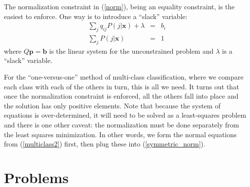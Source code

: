 \documentclass{article}
\renewcommand{\vec}[1]{\boldsymbol{#1}}
\begin{document}
The normalization constraint in (\ref{norm}), being an equality constraint,
is the easiest to enforce.
One way is to introduce a ``slack'' variable:
\begin{eqnarray}
	\sum_j q_{ij} P(j|\vec x) + \lambda & = & b_i \nonumber \\
	\sum_j P(j|\vec x) & = & 1 \label{symmetric_norm}
\end{eqnarray}
where $Q \vec p = \vec b$ is the linear system for the unconstrained problem
and $\lambda$ is a ``slack'' variable.

For the ``one-versus-one'' method of multi-class classification, where we
compare each class with each of the others in turn, this is all we need.
It turns out that once the normalization constraint is enforced, all the others
fall into place and the solution has only positive elements.
Note that because the system of equations is over-determined, 
it will need to be solved as a least-squares problem and there is one
other caveat: the normalization must be done separately from the least
squares minimization.
In other words, we form the normal equations from (\ref{multiclass2}) first,
then plug these into (\ref{symmetric_norm}).

\section{Problems}
\end{document}
